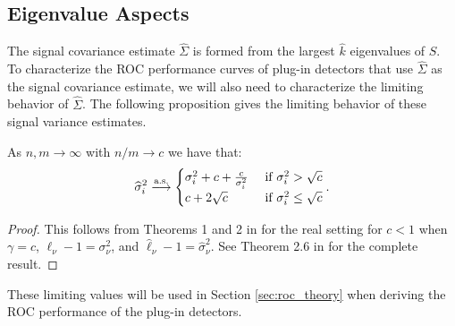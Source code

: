 \subsection{Eigenvalue Aspects}

The signal covariance estimate $\widehat{\Sigma}$ is formed from the largest $\widehat{k}$ eigenvalues of $S$. To characterize the ROC performance curves of plug-in detectors that use $\widehat{\Sigma}$ as the signal covariance estimate, we will also need to characterize the limiting behavior of $\widehat{\Sigma}$.  The following proposition gives the limiting behavior of these signal variance estimates.
\begin{prop}\label{th:eigvals_rmt}
As $n,m \longrightarrow \infty$ with $n/m \to c$ we have that:
\begin{equation*}
\widehat{\sigma}_i^2\overset{\textrm{a.s.}}{\longrightarrow}
\begin{cases}
 \sigma_i^2 + c + \frac{c}{\sigma_i^2} & \text{ if } \sigma_i^2 > \sqrt{c}\\
 c + 2\sqrt{c} & \text{ if } \sigma_i^2 \leq \sqrt{c}
\end{cases}.
\end{equation*}
\end{prop}
\begin{proof}
This follows from Theorems 1 and 2 in \cite{paul2007asymptotics} for the real setting for $c<1$ when $\gamma=c$, $\ell_\nu-1=\sigma_\nu^2$, and $\widehat{\ell}_\nu -1 = \widehat{\sigma}_\nu^2$. See Theorem 2.6 in \cite{benaych2011singular} for the complete result.
\end{proof}
These limiting values will be used in Section \ref{sec:roc_theory} when deriving the ROC performance of the plug-in detectors.


